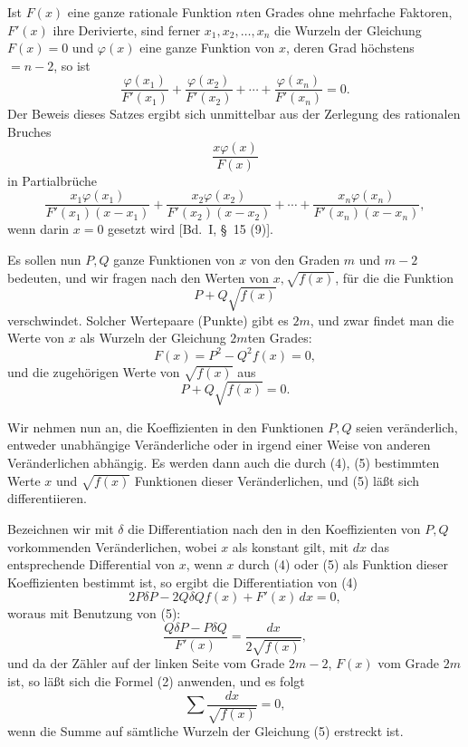 \documentclass[11pt]{article}
\begin{document}
Ist $F(x)$ eine ganze rationale Funktion $n$ten Grades ohne mehrfache Faktoren, $F'(x)$ ihre Derivierte, sind ferner $x_1,x_2,\ldots,x_n$ die Wurzeln der Gleichung $F(x)=0$ und $\varphi(x)$ eine ganze Funktion von $x$, deren Grad höchstens $=n-2$, so ist
\begin{equation}
\frac{\varphi(x_1)}{F'(x_1)}
+\frac{\varphi(x_2)}{F'(x_2)}
+\cdots+
\frac{\varphi(x_n)}{F'(x_n)}=0.
\tag{2}
\end{equation}
Der Beweis dieses Satzes ergibt sich unmittelbar aus der Zerlegung des rationalen Bruches
\[
\frac{x\varphi(x)}{F(x)}
\]
in Partialbrüche
\[
\frac{x_1\varphi(x_1)}{F'(x_1)(x-x_1)}
+\frac{x_2\varphi(x_2)}{F'(x_2)(x-x_2)}
+\cdots+
\frac{x_n\varphi(x_n)}{F'(x_n)(x-x_n)},
\]
wenn darin $x=0$ gesetzt wird [Bd.~I, \S~15 (9)].

Es sollen nun $P,Q$ ganze Funktionen von $x$ von den Graden $m$ und $m-2$ bedeuten, und wir fragen nach den Werten von $x,\sqrt{f(x)}$, für die die Funktion
\begin{equation}
P+Q\sqrt{f(x)}
\tag{3}
\end{equation}
verschwindet. Solcher Wertepaare (Punkte) gibt es $2m$, und zwar findet man die Werte von $x$ als Wurzeln der Gleichung $2m$ten Grades:
\begin{equation}
F(x)=P^2-Q^2f(x)=0,
\tag{4}
\end{equation}
und die zugehörigen Werte von $\sqrt{f(x)}$ aus
\begin{equation}
P+Q\sqrt{f(x)}=0.
\tag{5}
\end{equation}

Wir nehmen nun an, die Koeffizienten in den Funktionen $P,Q$ seien veränderlich, entweder unabhängige Veränderliche oder in irgend einer Weise von anderen Veränderlichen abhängig. Es werden dann auch die durch (4), (5) bestimmten Werte $x$ und $\sqrt{f(x)}$ Funktionen dieser Veränderlichen, und (5) läßt sich differentiieren.

Bezeichnen wir mit $\delta$ die Differentiation nach den in den Koeffizienten von $P,Q$ vorkommenden Veränderlichen, wobei $x$ als konstant gilt, mit $dx$ das entsprechende Differential von $x$, wenn $x$ durch (4) oder (5) als Funktion dieser Koeffizienten bestimmt ist, so ergibt die Differentiation von (4)
\[
2P\delta P-2Q\delta Q f(x)+F'(x)\,dx=0,
\]
woraus mit Benutzung von (5):
\begin{equation}
\frac{Q\delta P-P\delta Q}{F'(x)}
=
\frac{dx}{2\sqrt{f(x)}},
\tag{6}
\end{equation}
und da der Zähler auf der linken Seite vom Grade $2m-2$, $F(x)$ vom Grade $2m$ ist, so läßt sich die Formel (2) anwenden, und es folgt
\begin{equation}
\sum \frac{dx}{\sqrt{f(x)}}=0,
\tag{7}
\end{equation}
wenn die Summe auf sämtliche Wurzeln der Gleichung (5) erstreckt ist.
\end{document}

